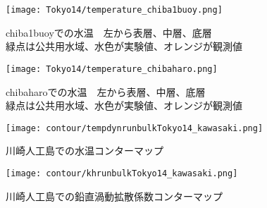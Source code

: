 \documentclass[fontsize=12pt,paper=a4]{jlreq}
\begin{document}
\begin{figure}[hbtp]
  \centering
  \texttt{[image: Tokyo14/temperature\_chiba1buoy.png]}
  \caption{chiba1buoyでの水温　左から表層、中層、底層\\緑点は公共用水域、水色が実験値、オレンジが観測値}
\end{figure}

\begin{figure}[hbtp]
  \centering
  \texttt{[image: Tokyo14/temperature\_chibaharo.png]}
  \caption{chibaharoでの水温　左から表層、中層、底層\\緑点は公共用水域、水色が実験値、オレンジが観測値}
\end{figure}


\begin{figure}[hbtp]
    \centering
    \texttt{[image: contour/tempdynrunbulkTokyo14\_kawasaki.png]}
    \caption{川崎人工島での水温コンターマップ}
\end{figure}


\begin{figure}[hbtp]
  \centering
  \texttt{[image: contour/khrunbulkTokyo14\_kawasaki.png]}
  \caption{川崎人工島での鉛直渦動拡散係数コンターマップ}
\end{figure}
\end{document}
